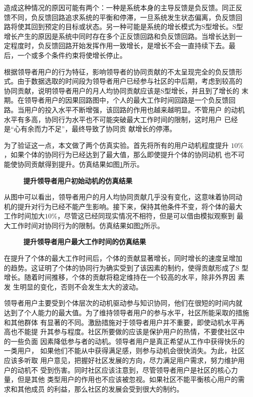 造成这种情况的原因可能有两个：一种是系统本身的主导反馈是负反馈。同正反
馈不同，负反馈回路追求系统的平衡和停滞，一旦系统发生状态偏离，负反馈回
路将使其回到预定的目标或状态。另一种可能是系统的增长模式为S型增长。S型
增长产生的原因是系统中同时存在多个正反馈回路和负反馈回路。当增长达到一
定程度时，负反馈回路开始发挥作用一致增长，是增长不会一直持续下去。最
后，一个或多个条件约束将使增长停止。

根据领导者用户的行为特征，影响领导者的协同贡献的不太呈现完全的负反馈形
式。由于数据选取的时间段为领导者用户已经参与社区的中后期，考虑到较高的
协同贡献，说明领导者用户的月人均协同贡献应该是S型增长，并且到了增长的
末期。在领导者用户的因果回路图中，个人的最大工作时间回路是一个负反馈回
路。当用户的投入水平不断增强，该回路的作用也越来越明显。不管用户
的动机水平有多高，协同行为水平也不可能突破最大工作时间的限制，这时用户
已经是“心有余而力不足”，最终导致了协同贡
献增长的停滞。

为了验证这一点，本文做了两个仿真实验。首先将所有的用户动机程度提升
$10\%$，如果个体的协同行为已经达到了最大值，那么即使提升个体的协同动机
也不可能使协同贡献得到提升。仿真结果如图\ref{fig:improve1}所示。

\begin{figure}
  \centering
  
  \caption{\small{\textbf{提升领导者用户初始动机的仿真结果}}}
  \label{fig:improve1}
\end{figure}

从图中可以看出，领导者用户的月人均协同贡献几乎没有变化，这意味着协同动
机的提升对行为已经不能产生影响。接下来，保持其他条件不变，将个体的最大
工作时间加大$10\%$，尽管这已经同现实情况不相符，但是可以借由模拟观察到
最大工作时间对协同行为的限制。仿真结果如图\ref{fig:improve2}所示。

\begin{figure}
  \centering
  
\caption{\small{\textbf{提升领导者用户最大工作时间的仿真结果}}}
  \label{fig:improve2}
\end{figure}

在提升了个体的最大工作时间后，个体的贡献显著增长，同时增长的速度呈增加
的趋势。这证明了个体的协同行为确实受到了该因素的制约，使得贡献形成了S
型增长。随着时间推移，个体的贡献将稳定维持在一个较高的水平，除非外界因
素发
生明显的变化，否则不会发生太大的波动。

领导者用户主要受到个体层次的动机驱动参与知识协同，他们在很短的时间内就
达到了个人能力的最大值。为了维持领导者用户的参与水平，社区所能采取的措施和其他群体
有显著的不同。激励措施对于领导者用户并不重要，即使动机水平再高也不能提
升其参与程度。社区所要做的应该是保护用户的热情，不要使社区中的一些负面
因素降低参与者的动机。领导者用户是真正希望从工作中获得快乐的一类用户，
如果他们不能从中获得满足感，则参与动机会很快消失。为此，社区应该多听取
用户意见，把握好社区发展的方向，尽力满足用户需求，努力维护用户的动机不
受到伤害。同时社区应该注意到，尽管领导者用户是社区的核心力量，但是其他
类型用户的作用也不应该被忽视。如果社区不能平衡核心用户的需求和其他成员
的利益，那么社区的发展会受到很大的制约。

